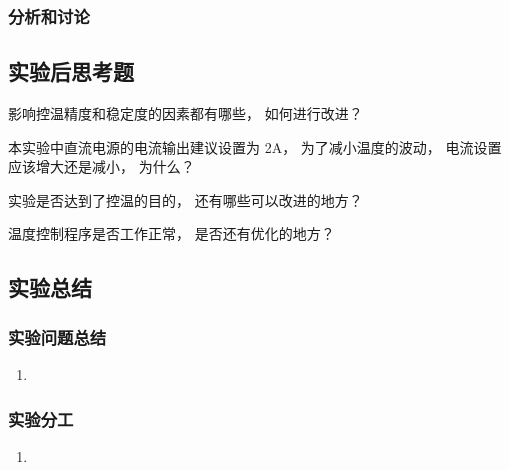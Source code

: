 \documentclass[dvipsnames, svgnames,a4paper,11pt]{article}
\begin{document}
\subsubsection{分析和讨论}







		

\subsection{实验后思考题}	
	
    \begin{question}
        影响控温精度和稳定度的因素都有哪些， 如何进行改进？
    \end{question}



    \begin{question}
        本实验中直流电源的电流输出建议设置为 2A， 为了减小温度的波动， 电流设置应该增大还是减小， 为什么？
    \end{question}


    \begin{question}
        实验是否达到了控温的目的， 还有哪些可以改进的地方？
    \end{question}


    \begin{question}
        温度控制程序是否工作正常， 是否还有优化的地方？
    \end{question}




\clearpage

\subsection{实验总结}
    
    \subsubsection{实验问题总结}

        \begin{enumerate}
            \item 
        \end{enumerate}

    \subsubsection{实验分工}

        \begin{enumerate}
            \item
        \end{enumerate}

\end{document}
